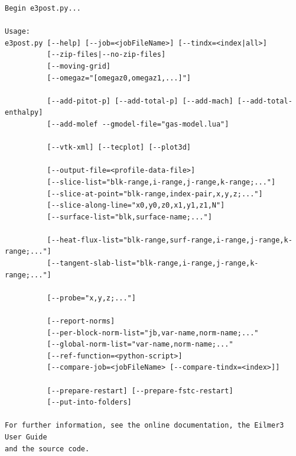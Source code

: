 \noindent
{\footnotesize
\begin{verbatim}
Begin e3post.py...

Usage:
e3post.py [--help] [--job=<jobFileName>] [--tindx=<index|all>]
          [--zip-files|--no-zip-files]
          [--moving-grid]
          [--omegaz="[omegaz0,omegaz1,...]"]

          [--add-pitot-p] [--add-total-p] [--add-mach] [--add-total-enthalpy]
          [--add-molef --gmodel-file="gas-model.lua"]

          [--vtk-xml] [--tecplot] [--plot3d]

          [--output-file=<profile-data-file>]
          [--slice-list="blk-range,i-range,j-range,k-range;..."]
          [--slice-at-point="blk-range,index-pair,x,y,z;..."]
          [--slice-along-line="x0,y0,z0,x1,y1,z1,N"]
          [--surface-list="blk,surface-name;..."]

          [--heat-flux-list="blk-range,surf-range,i-range,j-range,k-range;..."]
          [--tangent-slab-list="blk-range,i-range,j-range,k-range;..."]

          [--probe="x,y,z;..."]

          [--report-norms]
          [--per-block-norm-list="jb,var-name,norm-name;..."
          [--global-norm-list="var-name,norm-name;..."
          [--ref-function=<python-script>]
          [--compare-job=<jobFileName> [--compare-tindx=<index>]]

          [--prepare-restart] [--prepare-fstc-restart]
          [--put-into-folders]

For further information, see the online documentation, the Eilmer3 User Guide
and the source code.
\end{verbatim}
} %


